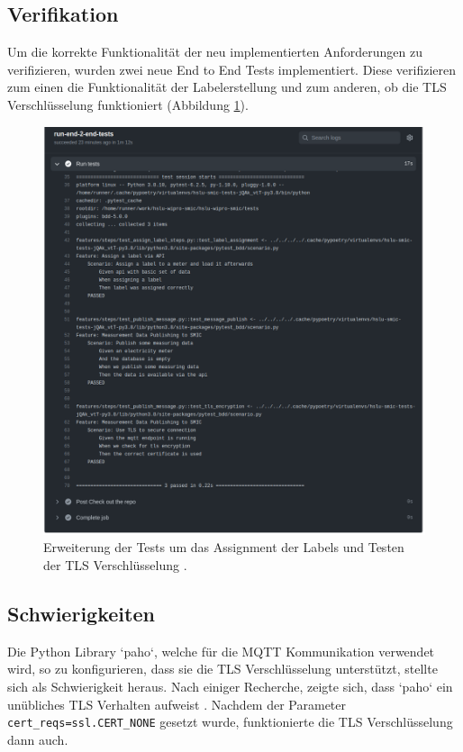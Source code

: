 \subsection{Verifikation}

Um die korrekte Funktionalität der neu implementierten Anforderungen zu verifizieren, wurden
zwei neue End to End Tests implementiert. Diese verifizieren zum einen die Funktionalität der
Labelerstellung und zum anderen, ob die \ac{TLS} Verschlüsselung funktioniert (Abbildung \ref{fig:test-iteration-3}).

\begin{figure}[h]
    \centering
    \includegraphics[width=1.0\textwidth]{gfx/testlog-iteration-2}
    \caption{
        Erweiterung der Tests um das Assignment der Labels und Testen der \ac{TLS} Verschlüsselung \parencite{randombenj_testlog_it_2_2021}.
    }
    \label{fig:test-iteration-3}
\end{figure}

\subsection{Schwierigkeiten}
Die Python Library `paho`, welche für die \ac{MQTT} Kommunikation verwendet wird, so zu konfigurieren, 
dass sie die \ac{TLS} Verschlüsselung unterstützt, stellte sich als Schwierigkeit heraus.
Nach einiger Recherche, zeigte sich, dass `paho` ein unübliches \ac{TLS}
Verhalten aufweist \parencite{eclipse_paho_ssl_2019}.
Nachdem der Parameter \texttt{cert\_reqs=ssl.CERT\_NONE} gesetzt wurde, funktionierte
die \ac{TLS} Verschlüsselung dann auch.